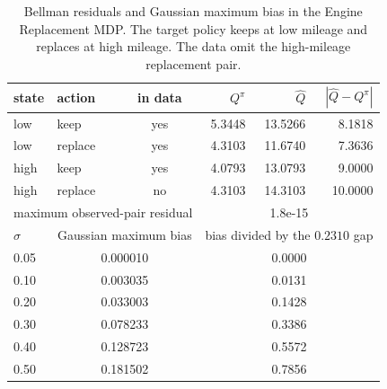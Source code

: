 \begin{table}[H]
\centering
\caption{Bellman residuals and Gaussian maximum bias in the Engine Replacement MDP. The target policy keeps at low mileage and replaces at high mileage. The data omit the high-mileage replacement pair.}
\label{tab:engine_bellman_error}
\small
\begin{tabular}{llcrrr}
\hline
state & action & in data & $Q^\pi$ & $\widehat Q$ & $|\widehat Q-Q^\pi|$ \\
\hline
low & keep & yes & 5.3448 & 13.5266 & 8.1818 \\
low & replace & yes & 4.3103 & 11.6740 & 7.3636 \\
high & keep & yes & 4.0793 & 13.0793 & 9.0000 \\
high & replace & no & 4.3103 & 14.3103 & 10.0000 \\
\hline
\multicolumn{3}{l}{maximum observed-pair residual} & \multicolumn{3}{c}{1.8e-15} \\
\hline
$\sigma$ & \multicolumn{2}{c}{Gaussian maximum bias} & \multicolumn{3}{c}{bias divided by the $0.2310$ gap} \\
\hline
0.05 & \multicolumn{2}{c}{0.000010} & \multicolumn{3}{c}{0.0000} \\
0.10 & \multicolumn{2}{c}{0.003035} & \multicolumn{3}{c}{0.0131} \\
0.20 & \multicolumn{2}{c}{0.033003} & \multicolumn{3}{c}{0.1428} \\
0.30 & \multicolumn{2}{c}{0.078233} & \multicolumn{3}{c}{0.3386} \\
0.40 & \multicolumn{2}{c}{0.128723} & \multicolumn{3}{c}{0.5572} \\
0.50 & \multicolumn{2}{c}{0.181502} & \multicolumn{3}{c}{0.7856} \\
\hline
\end{tabular}
\end{table}

